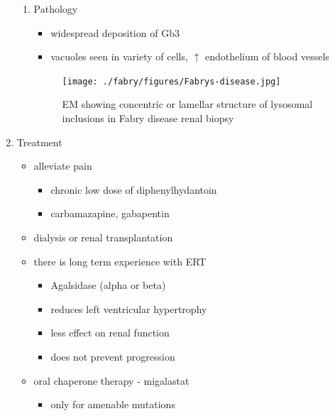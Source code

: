 \documentclass{scrartcl}
\begin{document}
\begin{enumerate}
\begin{enumerate}
\item Pathology
\label{sec:org545a5c7}
\begin{itemize}
\item widespread deposition of Gb3
\item vacuoles seen in variety of cells, \(\uparrow\) endothelium of blood vessels
\end{itemize}

\begin{figure}[htbp]
\centering
\texttt{[image: ./fabry/figures/Fabrys-disease.jpg]}
\caption[Fabry EM]{\label{fig:orgbbcd935}
EM showing concentric or lamellar structure of lysosomal inclusions in Fabry disease renal biopsy}
\end{figure}
\end{enumerate}

\item Treatment
\label{sec:org4ef4715}
\begin{itemize}
\item alleviate pain
\begin{itemize}
\item chronic low dose of diphenylhydantoin
\item carbamazapine, gabapentin
\end{itemize}
\item dialysis or renal transplantation
\item there is long term experience with ERT
\begin{itemize}
\item Agalsidase (alpha or beta)
\item reduces left ventricular hypertrophy
\item less effect on renal function
\item does not prevent progression
\end{itemize}
\item oral chaperone therapy - migalastat
\begin{itemize}
\item only for amenable mutations
\end{itemize}
\end{itemize}
\end{enumerate}
\end{document}
